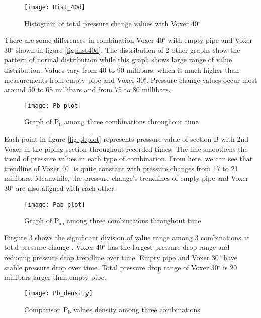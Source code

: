 \begin{figure}[h]
  \centering
  \texttt{[image: Hist\_40d]}
  \caption{ Histogram of total pressure change values  with Voxer 40$^{\circ}$}
  \label{fig:hist40d}
\end{figure}

There are some differences in combination Voxer 40$^{\circ}$ with empty pipe and Voxer 30$^{\circ}$ shown in figure \vref{fig:hist40d}. The distribution of 2 other graphs show the pattern of normal distribution while this graph shows large range of value distribution. Values vary from 40 to 90 millibars, which is much higher than measurements from empty pipe and Voxer 30$^{\circ}$. Pressure change values occur most around 50 to 65 millibars and from 75 to 80 millibars. 

\begin{figure}[h]
  \centering
  \texttt{[image: Pb\_plot]}
  \caption{ Graph of P$_{\text{b}}$ among three combinations throughout time}
  \label{fig:pbplot}
\end{figure}

Each point in figure \vref{fig:pbplot} represents pressure value of section B with 2nd Voxer in the piping section throughout recorded times. The line smoothens the trend of pressure values in each type of combination. From here, we can see that trendline of Voxer 40$^{\circ}$ is quite constant with pressure changes from 17 to 21 millibars. Meanwhile, the pressure change's trendlines of empty pipe and Voxer 30$^{\circ}$ are also aligned with each other. 

\begin{figure}[h]
  \centering
  \texttt{[image: Pab\_plot]}
  \caption{ Graph of P$_{\text{ab}}$ among three combinations throughout time}
  \label{fig:pabplot}
\end{figure}

Firgure \ref{fig:pabplot} shows the significant division of value range among 3 combinations at total pressure change . Voxer 40$^{\circ}$  has the largest pressure drop range and reducing pressure drop trendline over time. Empty pipe and Voxer 30$^{\circ}$ have stable pressure drop over time. Total pressure drop range of Voxer 30$^{\circ}$ is 20 millibars larger than empty pipe. 

\begin{figure}[h!]
  \centering
  \texttt{[image: Pb\_density]}
  \caption{ Comparison P$_{\text{b}}$ values density among three combinations}
  \label{fig:pbdensity}
\end{figure}

